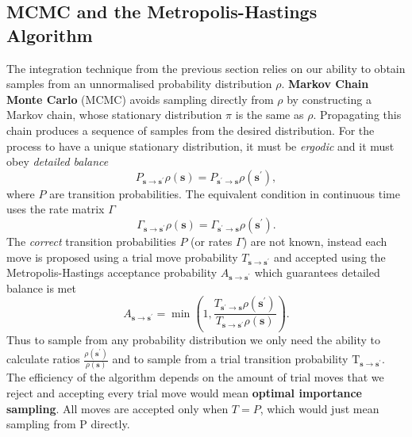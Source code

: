 \subsection{MCMC and the Metropolis-Hastings Algorithm}
\label{subsec:Impl-MCMC}
The integration technique from the previous section relies on our ability to obtain samples from an unnormalised probability distribution $\rho$. \textbf{Markov Chain Monte Carlo} (MCMC) avoids sampling directly from $\rho$ by constructing a Markov chain, whose stationary distribution $\pi$ is the same as $\rho$. Propagating this chain produces a sequence of samples from the desired distribution. For the process to have a unique stationary distribution, it must be \emph{ergodic} and it must obey \emph{detailed balance}
\begin{equation}
	P_{\mathbf{s \rightarrow \mathbf{s}^\prime}}\rho(\mathbf{s}) = P_{\mathbf{s^\prime \rightarrow \mathbf{s}}} \rho(\mathbf{s}^\prime),
\end{equation}
where $P$ are transition probabilities. The equivalent condition in continuous time uses the rate matrix $\Gamma$
\begin{equation}
	\Gamma_{\mathbf{s \rightarrow \mathbf{s}^\prime}}\rho(\mathbf{s}) = \Gamma_{\mathbf{s^\prime \rightarrow \mathbf{s}}} \rho(\mathbf{s}^\prime).
\end{equation}
The \emph{correct} transition probabilities $P$ (or rates $\Gamma$) are not known, instead each move is proposed using a trial move probability $T_{\mathbf{s \rightarrow \mathbf{s}^\prime}}$ and accepted using the Metropolis-Hastings acceptance probability $A_{\mathbf{s \rightarrow \mathbf{s}^\prime}}$ which guarantees detailed balance is met
\begin{equation}
	A_{\mathbf{s \rightarrow \mathbf{s}^\prime}} = \min \left(1, \frac{T_{\mathbf{s^\prime \rightarrow \mathbf{s}}} \rho(\mathbf{s}^\prime)}{
		T_{\mathbf{s \rightarrow \mathbf{s}^\prime}}\rho(\mathbf{s})}\right).
\end{equation} 
Thus to sample from any probability distribution we only need the ability to calculate ratios $\frac{\rho(\boldsymbol{s}^{\prime})}{\rho(\boldsymbol{s})}$ and to sample from a trial transition probability $\mathrm T_{\mathbf{s \rightarrow \mathbf{s}^\prime}}$. The efficiency of the algorithm depends on the amount of trial moves that we reject and accepting every trial move would mean \textbf{optimal importance sampling}. All moves are accepted only when $T = P$, which would just mean sampling from $\mathrm P$ directly. 

